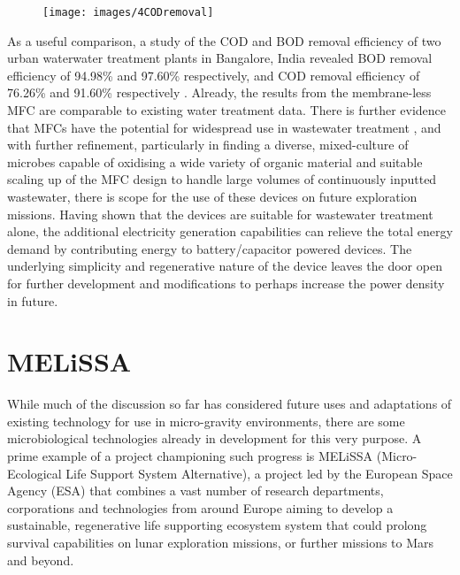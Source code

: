 \documentclass[12pt]{article}
\begin{document}
\begin{figure}[ht]
\centering
\texttt{[image: images/4CODremoval]}
\caption[\cite{ghangrekar2006wastewater} A table displaying BOD and COD removal under varying conditions]{}
\label{fig:4CODremoval}
\end{figure}

As a useful comparison, a study of the COD and BOD removal efficiency of two urban waterwater treatment plants in Bangalore, India revealed BOD removal efficiency of 94.98\% and 97.60\% respectively, and COD removal efficiency of 76.26\% and 91.60\% respectively \cite{pravikumar2010assessment}. Already, the results from the membrane-less MFC are comparable to existing water treatment data. There is further evidence that MFCs have the potential for widespread use in wastewater treatment \cite{fornero2010electric}, and with further refinement, particularly in finding a diverse, mixed-culture of microbes capable of oxidising a wide variety of organic material and suitable scaling up of the MFC design to handle large volumes of continuously inputted wastewater, there is scope for the use of these devices on future exploration missions. Having shown that the devices are suitable for wastewater treatment alone, the additional electricity generation capabilities can relieve the total energy demand by contributing energy to battery/capacitor powered devices. The underlying simplicity and regenerative nature of the device leaves the door open for further development and modifications to perhaps increase the power density in future.

\section{MELiSSA}

While much of the discussion so far has considered future uses and adaptations of existing technology for use in micro-gravity environments, there are some microbiological technologies already in development for this very purpose. A prime example of a project championing such progress is MELiSSA (Micro-Ecological Life Support System Alternative), a project led by the European Space Agency (ESA) that combines a vast number of research departments, corporations and technologies from around Europe aiming to develop a sustainable, regenerative life supporting ecosystem system that could prolong survival capabilities on lunar exploration missions, or further missions to Mars and beyond. \cite{agency2008melissa} 
\end{document}
